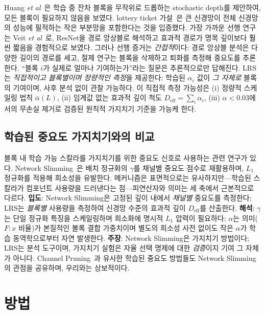 \documentclass{bmvc2k}
\def\etal{\emph{et al}\bmvaOneDot}
\begin{document}
Huang \etal~\cite{huang2016deep}은 학습 중 잔차 블록을 무작위로 드롭하는 stochastic depth를 제안하여, 모든 블록이 필요하지 않음을 보였다. lottery ticket 가설~\cite{frankle2019lottery}은 큰 신경망이 전체 신경망의 성능에 필적하는 작은 부분망을 포함한다는 것을 입증했다. 가장 가까운 선행 연구는 Veit \etal~\cite{veit2016residual}로, ResNet을 경로 앙상블로 해석하고 효과적 경로가 명목 깊이보다 훨씬 짧음을 경험적으로 보였다. 그러나 선행 증거는 \emph{간접적}이다: 경로 앙상블 분석은 다양한 길이의 경로를 세고, 절제 연구는 블록을 삭제하고 퇴화를 측정해 중요도를 추론한다. ``블록 $i$가 실제로 얼마나 기여하는가''라는 질문은 추론적으로만 답해진다. LRS는 \emph{직접적이고 블록별이며 정량적인 측정}을 제공한다: 학습된 $\alpha_i$ 값이 \emph{그 자체로} 블록의 기여이며, 사후 분석 없이 관찰 가능하다. 이 직접적 측정 가능성은 (i) 정량적 스케일링 법칙 $\bar{\alpha}(L)$, (ii) 임계값 없는 효과적 깊이 척도 $D_\text{eff} = \sum_i \alpha_i$, (iii) $\alpha < 0.03$에서의 무손실 제거로 검증된 원칙적 가지치기 기준을 가능케 한다.

\subsection{학습된 중요도 가지치기와의 비교}

블록 내 학습 가능 스칼라를 가지치기를 위한 중요도 신호로 사용하는 관련 연구가 있다. Network Slimming~\cite{liu2017slimming}은 배치 정규화의 $\gamma$를 채널별 중요도 점수로 재활용하며, $L_1$ 정규화를 적용해 희소성을 유발한다. 메커니즘은 표면적으로는 유사하지만---학습된 스칼라가 컴포넌트 사용량을 드러낸다는 점---피연산자와 의미는 세 축에서 근본적으로 다르다. \textbf{입도}: Network Slimming은 고정된 깊이 내에서 \emph{채널별} 중요도를 측정한다; LRS는 \emph{블록별} 사용량을 측정하여 신경망 수준의 효과적 깊이 $D_\text{eff}$를 산출한다. \textbf{해석}: $\gamma$는 단일 정규화 특징을 스케일링하며 희소화에 명시적 $L_1$ 압력이 필요하다; $\alpha$는 의미($F{:}x$ 비율)가 본질적인 볼록 결합 가중치이며 별도의 희소성 사전 없이도 작은 $\alpha$가 학습 동역학으로부터 자연 발생한다. \textbf{주장}: Network Slimming은 가지치기 방법이다; LRS는 분석 도구이며, 가지치기 실험은 자율 선택 명제에 대한 \emph{검증}이지 기여 그 자체가 아니다. Channel Pruning~\cite{he2017channel}과 유사한 학습된 중요도 방법들도 Network Slimming의 관점을 공유하며, 우리와는 상보적이다.

\section{방법}
\label{sec:method}
\end{document}
